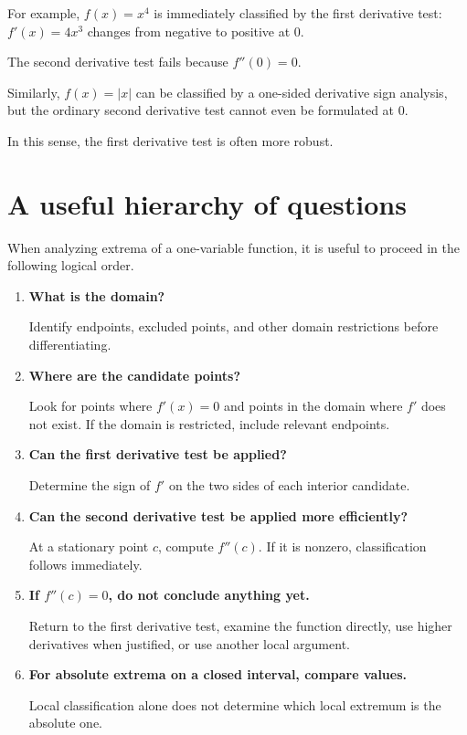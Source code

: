 \documentclass{essay}
\begin{document}
For example, \(f(x)=x^{4}\) is immediately classified by the first derivative test: \(f'(x)=4x^{3}\) changes from negative to positive at \(0\).

The second derivative test fails because \(f''(0)=0\).

Similarly, \(f(x)=|x|\) can be classified by a one-sided derivative sign analysis, but the ordinary second derivative test cannot even be formulated at \(0\).

In this sense, the first derivative test is often more robust.

\section{A useful hierarchy of questions}

When analyzing extrema of a one-variable function, it is useful to proceed in the following logical order.

\begin{enumerate}
  \item \textbf{What is the domain?}

    Identify endpoints, excluded points, and other domain restrictions before differentiating.

  \item \textbf{Where are the candidate points?}

    Look for points where \(f'(x)=0\) and points in the domain where \(f'\) does not exist. If the domain is restricted, include relevant endpoints.

  \item \textbf{Can the first derivative test be applied?}

    Determine the sign of \(f'\) on the two sides of each interior candidate.

  \item \textbf{Can the second derivative test be applied more efficiently?}

    At a stationary point \(c\), compute \(f''(c)\). If it is nonzero, classification follows immediately.

  \item \textbf{If \(f''(c)=0\), do not conclude anything yet.}

    Return to the first derivative test, examine the function directly, use higher derivatives when justified, or use another local argument.

  \item \textbf{For absolute extrema on a closed interval, compare values.}

    Local classification alone does not determine which local extremum is the absolute one.
\end{enumerate}
\end{document}
